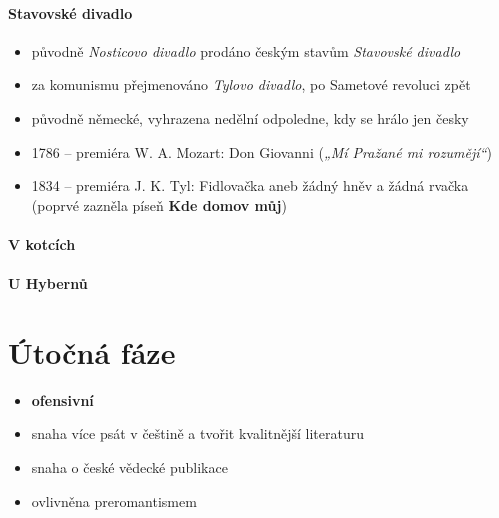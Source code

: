 \paragraph{Stavovské divadlo}
\begin{itemize}
\item původně \textit{Nosticovo divadlo} \ra prodáno českým stavům \ra \textit{Stavovské divadlo}
\item za komunismu přejmenováno \textit{Tylovo divadlo}, po Sametové revoluci zpět
\item původně německé, vyhrazena nedělní odpoledne, kdy se hrálo jen česky
\item 1786 -- premiéra W. A. Mozart: Don Giovanni (\textit{„Mí Pražané mi rozumějí“})
\item 1834 -- premiéra J. K. Tyl: Fidlovačka aneb žádný hněv a žádná rvačka (poprvé zazněla píseň \textbf{Kde domov můj})
\end{itemize}
\paragraph{V kotcích}
\paragraph{U Hybernů}

\section{Útočná fáze}
\begin{itemize}
\item \textbf{ofensivní}
\item snaha více psát v češtině a tvořit kvalitnější literaturu
\item snaha o české vědecké publikace
\item ovlivněna preromantismem
\end{itemize}

